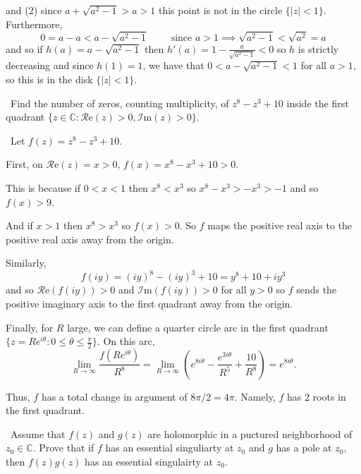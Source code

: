 \documentclass[12pt]{Homework}
\newcommand{\im}{\mathscr{I}\text{m}}
\newcommand{\re}{\mathscr{R}\text{e}}
\begin{document}
\begin{solution}
and (2) since $a+\sqrt{a^2-1}>a>1$ this point is not in the circle $\{|z|<1\}$. Furthermore, $$0=a-a<a-\sqrt{a^2-1}\qquad\text{ since }a>1\implies \sqrt{a^2-1}<\sqrt{a^2}=a$$ and so if $h(a)=a-\sqrt{a^2-1}$ then $h'(a)=1-\frac{a}{\sqrt{a^2-1}}<0$ so $h$ is strictly decreasing and since $h(1)=1$, we have that $0<a-\sqrt{a^2-1}<1$ for all $a>1$, so this is in the disk $\{|z|<1\}.$

\end{solution}
\newpage



\begin{problem} $\,$
Find the number of zeros, counting multiplicity, of $z^8-z^3+10$ inside the first quadrant $\{z\in\mathbb{C}:\re(z)>0,\im(z)>0\}.$
\end{problem}

\begin{solution}$\,$
Let $f(z)=z^8-z^3+10$.

First, on $\re(z)=x>0$, $f(x)=x^8-x^3+10>0$.

This is because if $0<x<1$ then $x^8<x^3$ so $x^8-x^3>-x^3>-1$ and so $f(x)>9$.

And if $x>1$ then $x^8>x^3$ so $f(x)>0$. So $f$ maps the positive real axis to the positive real axis away from the origin. 

Similarly, $$f(iy)=(iy)^8-(iy)^3+10=y^8+10+iy^3$$ and so $\re(f(iy))>0$ and $\im(f(iy))>0$ for all $y>0$ so $f$ sends the positive imaginary axis to the first quadrant away from the origin.

Finally, for $R$ large, we can define a quarter circle arc in the first quadrant $\{z=Re^{i\theta}:0\le\theta\le\frac{\pi}{2}\}$. On this arc, $$\lim_{R\to\infty}\frac{f(Re^{i\theta})}{R^8}=\lim_{R\to\infty}\left(e^{8i\theta}-\frac{e^{3i\theta}}{R^5}+\frac{10}{R^8}\right)=e^{8i\theta}.$$

Thus, $f$ has a total change in argument of $8\pi/2=4\pi.$ Namely, $f$ has $2$ roots in the first quadrant.
\end{solution}
\newpage




\begin{problem} $\,$
Assume that $f(z)$ and $g(z)$ are holomorphic in a puctured neighborhood of $z_0\in\mathbb{C}$. Prove that if $f$ has an essential singuliarty at $z_0$ and $g$ has a pole at $z_0,$ then $f(z)g(z)$ has an essential singulairty at $z_0.$
\end{problem}
\end{document}
